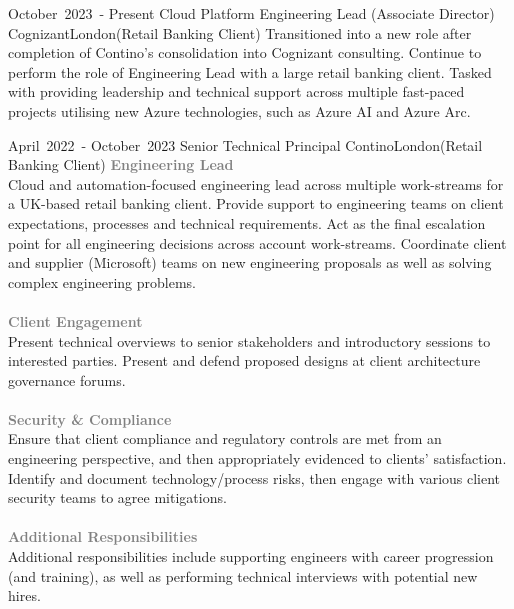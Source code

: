 
\edef\hc{\string:}
\cventry %
  {\mbox{October 2023 -} \mbox{Present}}
  {Cloud Platform Engineering Lead (Associate Director)}
  {Cognizant}{London}{(Retail Banking Client)}
  {
    Transitioned into a new role after completion of Contino's consolidation into 
    Cognizant consulting. Continue to perform the role of Engineering Lead with 
    a large retail banking client. Tasked with providing leadership and technical 
    support across multiple fast-paced projects utilising new Azure technologies, 
    such as Azure AI and Azure Arc.
  }


\cventry %
  {\mbox{April 2022 -} \mbox{October 2023}}
  {Senior Technical Principal}
  {Contino}{London}{(Retail Banking Client)}
  {
    \textcolor{gray}{\textbf{Engineering Lead}}\\ 
    Cloud and automation-focused engineering lead across multiple work-streams 
    for a UK-based retail banking client. Provide support to engineering teams
    on client expectations, processes and technical requirements.
    Act as the final escalation point for all engineering decisions across 
    account work-streams. Coordinate client and supplier (Microsoft) teams on
    new engineering proposals as well as solving complex engineering problems.\\\\
    \textcolor{gray}{\textbf{Client Engagement}}\\ 
    Present technical overviews to senior stakeholders and introductory sessions
    to interested parties. Present and defend proposed designs at client 
    architecture governance forums.\\\\
    \textcolor{gray}{\textbf{Security \& Compliance}}\\ 
    Ensure that client compliance and regulatory controls are met from an engineering 
    perspective, and then appropriately evidenced to clients' satisfaction.
    Identify and document technology/process risks, then engage with various client
    security teams to agree mitigations.\\\\
    \textcolor{gray}{\textbf{Additional Responsibilities}}\\ 
    Additional responsibilities include supporting engineers with career
    progression (and training), as well as performing technical interviews with
    potential new hires.\\
  }

